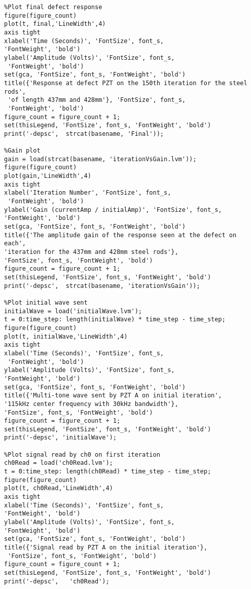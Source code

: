 \begin{lstlisting}
%Plot final defect response
figure(figure_count)
plot(t, final,'LineWidth',4)
axis tight
xlabel('Time (Seconds)', 'FontSize', font_s, 
'FontWeight', 'bold')
ylabel('Amplitude (Volts)', 'FontSize', font_s,
 'FontWeight', 'bold')
set(gca, 'FontSize', font_s, 'FontWeight', 'bold')
title({'Response at defect PZT on the 150th iteration for the steel rods',
 'of length 437mm and 428mm'}, 'FontSize', font_s, 
 'FontWeight', 'bold')
figure_count = figure_count + 1;
set(thisLegend, 'FontSize', font_s, 'FontWeight', 'bold')
print('-depsc',  strcat(basename, 'Final'));

%Gain plot
gain = load(strcat(basename, 'iterationVsGain.lvm'));
figure(figure_count)
plot(gain,'LineWidth',4)
axis tight
xlabel('Iteration Number', 'FontSize', font_s,
 'FontWeight', 'bold')
ylabel('Gain (currentAmp / initialAmp)', 'FontSize', font_s, 
'FontWeight', 'bold')
set(gca, 'FontSize', font_s, 'FontWeight', 'bold')
title({'The amplitude gain of the response seen at the defect on each', 
'iteration for the 437mm and 428mm steel rods'}, 
'FontSize', font_s, 'FontWeight', 'bold')
figure_count = figure_count + 1;
set(thisLegend, 'FontSize', font_s, 'FontWeight', 'bold')
print('-depsc',  strcat(basename, 'iterationVsGain'));

%Plot initial wave sent
initialWave = load('initialWave.lvm');
t = 0:time_step: length(initialWave) * time_step - time_step;
figure(figure_count)
plot(t, initialWave,'LineWidth',4)
axis tight
xlabel('Time (Seconds)', 'FontSize', font_s,
 'FontWeight', 'bold')
ylabel('Amplitude (Volts)', 'FontSize', font_s, 
'FontWeight', 'bold')
set(gca, 'FontSize', font_s, 'FontWeight', 'bold')
title({'Multi-tone wave sent by PZT A on initial iteration', 
'115kHz center frequency with 30kHz bandwidth'}, 
'FontSize', font_s, 'FontWeight', 'bold')
figure_count = figure_count + 1;
set(thisLegend, 'FontSize', font_s, 'FontWeight', 'bold')
print('-depsc', 'initialWave');

%Plot signal read by ch0 on first iteration
ch0Read = load('ch0Read.lvm');
t = 0:time_step: length(ch0Read) * time_step - time_step;
figure(figure_count)
plot(t, ch0Read,'LineWidth',4)
axis tight
xlabel('Time (Seconds)', 'FontSize', font_s, 
'FontWeight', 'bold')
ylabel('Amplitude (Volts)', 'FontSize', font_s, 
'FontWeight', 'bold')
set(gca, 'FontSize', font_s, 'FontWeight', 'bold')
title({'Signal read by PZT A on the initial iteration'},
 'FontSize', font_s, 'FontWeight', 'bold')
figure_count = figure_count + 1;
set(thisLegend, 'FontSize', font_s, 'FontWeight', 'bold')
print('-depsc',   'ch0Read');


\end{lstlisting}
